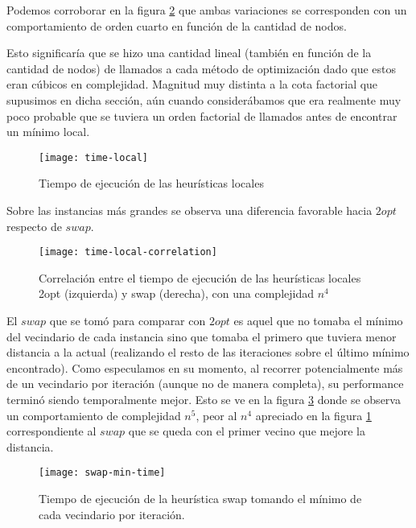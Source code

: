 Podemos corroborar en la figura \ref{fig:time-local-correlation} que ambas variaciones se corresponden con un comportamiento de orden cuarto en función de la cantidad de nodos.

Esto significaría que se hizo una cantidad lineal (también en función de la cantidad de nodos) de llamados a cada método de optimización dado que estos eran cúbicos en complejidad. Magnitud muy distinta a la cota factorial que supusimos en dicha sección, aún cuando considerábamos que era realmente muy poco probable que se tuviera un orden factorial de llamados antes de encontrar un mínimo local.

\begin{figure}[H]
    \centering
    \texttt{[image: time-local]}
    \caption{Tiempo de ejecución de las heurísticas locales}
    \label{fig:time-local}
\end{figure}

Sobre las instancias más grandes se observa una diferencia favorable hacia $2opt$ respecto de $swap$.

\begin{figure}[H]
    \centering
    \texttt{[image: time-local-correlation]}
    \caption{Correlación entre el tiempo de ejecución de las heurísticas locales 2opt (izquierda) y swap (derecha), con una complejidad $n^4$}
    \label{fig:time-local-correlation}
\end{figure}

    El $swap$ que se tomó para comparar con $2opt$ es aquel que no tomaba el mínimo del vecindario de cada instancia sino que tomaba el primero que tuviera menor distancia a la actual (realizando el resto de las iteraciones sobre el último mínimo encontrado).
    Como especulamos en su momento, al recorrer potencialmente más de un vecindario por iteración (aunque no de manera completa), su performance terminó siendo temporalmente mejor. Esto se ve en la figura \ref{fig:time-local-swap_min} donde se observa un comportamiento de complejidad $n^5$, peor al $n^4$ apreciado en la figura \ref{fig:time-local} correspondiente al $swap$ que se queda con el primer vecino que mejore la distancia.

\begin{figure}[H]
    \centering
    \texttt{[image: swap-min-time]}
    \caption{Tiempo de ejecución de la heurística swap tomando el mínimo de cada vecindario por iteración.}
    \label{fig:time-local-swap_min}
\end{figure}

